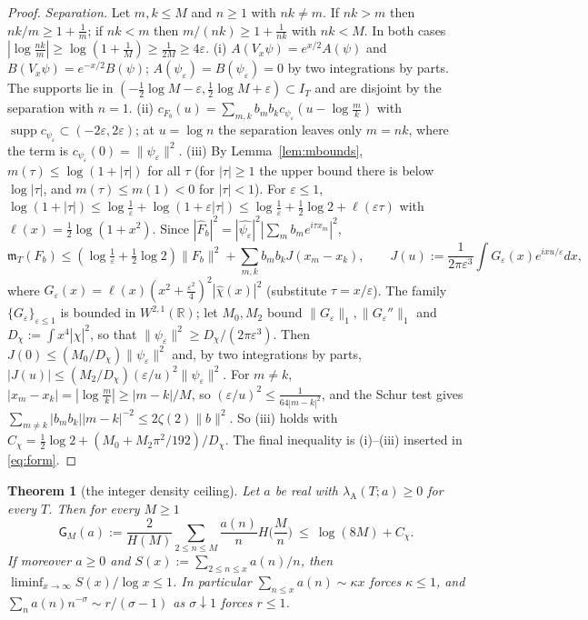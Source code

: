 \documentclass[11pt]{amsart}
\newtheorem{theorem}{Theorem}[section]
\theoremstyle{definition}
\theoremstyle{remark}
\newcommand{\R}{\mathbb R}
\newcommand{\supp}{\operatorname{supp}}
\newcommand{\IT}{I_T}
\newcommand{\Fh}{\widehat F}
\newcommand{\mT}{\mathfrak m_T}
\begin{document}
\begin{proof}
\emph{Separation.} Let $m,k\le M$ and $n\ge1$ with $nk\ne m$. If $nk>m$ then $nk/m\ge1+\frac1m$; if $nk<m$ then $m/(nk)\ge1+\frac1{nk}$
with $nk<M$. In both cases $|\log\frac{nk}m|\ge\log(1+\frac1M)\ge\frac1{2M}\ge4\varepsilon$.
(i) $A(V_x\psi)=e^{x/2}A(\psi)$ and $B(V_x\psi)=e^{-x/2}B(\psi)$; $A(\psi_\varepsilon)=B(\psi_\varepsilon)=0$ by two integrations by parts. The
supports lie in $(-\frac12\log M-\varepsilon,\frac12\log M+\varepsilon)\subset\IT$ and are disjoint by the separation with $n=1$.
(ii) $c_{F_b}(u)=\sum_{m,k}b_mb_kc_{\psi_\varepsilon}(u-\log\frac mk)$ with $\supp c_{\psi_\varepsilon}\subset(-2\varepsilon,2\varepsilon)$; at $u=\log n$ the
separation leaves only $m=nk$, where the term is $c_{\psi_\varepsilon}(0)=\|\psi_\varepsilon\|^2$.
(iii) By Lemma~\ref{lem:mbounds}, $m(\tau)\le\log(1+|\tau|)$ for all $\tau$ (for $|\tau|\ge1$ the upper bound there is below $\log|\tau|$, and
$m(\tau)\le m(1)<0$ for $|\tau|<1$). For $\varepsilon\le1$, $\log(1+|\tau|)\le\log\frac1\varepsilon+\log(1+\varepsilon|\tau|)\le\log\frac1\varepsilon+\frac12\log2+\ell(\varepsilon\tau)$
with $\ell(x)=\frac12\log(1+x^2)$. Since $|\Fh_b|^2=|\widehat{\psi_\varepsilon}|^2|\sum_mb_me^{i\tau x_m}|^2$,
\[
\mT(F_b)\le(\log\tfrac1\varepsilon+\tfrac12\log2)\|F_b\|^2+\sum_{m,k}b_mb_kJ(x_m-x_k),\qquad
J(u):=\frac1{2\pi\varepsilon^3}\int G_\varepsilon(x)e^{ixu/\varepsilon}dx,
\]
where $G_\varepsilon(x)=\ell(x)(x^2+\frac{\varepsilon^2}4)^2|\widehat\chi(x)|^2$ (substitute $\tau=x/\varepsilon$). The family $\{G_\varepsilon\}_{\varepsilon\le1}$ is bounded in
$W^{2,1}(\R)$; let $M_0,M_2$ bound $\|G_\varepsilon\|_1,\|G_\varepsilon''\|_1$ and $D_\chi:=\int x^4|\widehat\chi|^2$, so that
$\|\psi_\varepsilon\|^2\ge D_\chi/(2\pi\varepsilon^3)$. Then $J(0)\le(M_0/D_\chi)\|\psi_\varepsilon\|^2$ and, by two integrations by parts,
$|J(u)|\le(M_2/D_\chi)(\varepsilon/u)^2\|\psi_\varepsilon\|^2$. For $m\ne k$, $|x_m-x_k|=|\log\frac mk|\ge|m-k|/M$, so $(\varepsilon/u)^2\le\frac1{64|m-k|^2}$,
and the Schur test gives $\sum_{m\ne k}|b_mb_k||m-k|^{-2}\le2\zeta(2)\|b\|^2$. So (iii) holds with
$C_\chi=\frac12\log2+(M_0+M_2\pi^2/192)/D_\chi$. The final inequality is (i)--(iii) inserted in \eqref{eq:form}.
\end{proof}

\begin{theorem}[the integer density ceiling]\label{thm:ceiling}
Let $a$ be real with $\lambda_{\mathrm A}(T;a)\ge0$ for every $T$. Then for every $M\ge1$
\[
\mathsf G_M(a):=\frac2{H(M)}\sum_{2\le n\le M}\frac{a(n)}nH\Big(\frac Mn\Big)\ \le\ \log(8M)+C_\chi .
\]
If moreover $a\ge0$ and $S(x):=\sum_{2\le n\le x}a(n)/n$, then $\liminf_{x\to\infty}S(x)/\log x\le1$. In particular
$\sum_{n\le x}a(n)\sim\kappa x$ forces $\kappa\le1$, and $\sum_na(n)n^{-\sigma}\sim r/(\sigma-1)$ as $\sigma\downarrow1$ forces $r\le1$.
\end{theorem}
\end{document}
